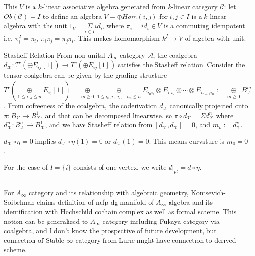 \documentclass{article}
\begin{document}
\begin{remark} [] 
This $V$ is a $k$-linear associative algebra generated from $k$-linear category $\mathcal{C}$: 
let $Ob(\mathcal{C})=I$ to define an algebra $V= \oplus Hom(i,j)$ for $i,j\in I$ is a $k$-linear algebra
with the unit $1_V = \underset{i\in I}{\Sigma} id_i$, where $\pi_i = id_i\in V$ is a commuting idempotent i.e. $\pi_i^2 = \pi_i$, 
$\pi_i \pi_j = \pi_j \pi_i$. This makes homomorphism $k^I \to V$ of algebra with unit.
\end{remark}


\begin{proposition}{Stasheff Relation}{}
From non-unital $A_\infty$ category $\mathcal{A}$, the coalgebra $d_{\mathcal{X}}: T^c (\oplus E_{ij}[1]) \to T^c (\oplus E_{ij}[1])$ 
satisfies the Stasheff relation. Consider the tensor coalgebra can be given by the grading structure
$T^c(\underset{1\leqq i,j\leqq n}{\oplus} E_{ij}[1]) = \underset{m\geqq 0}{\oplus} \underset{1\leqq i_0,i_1,i_2,\cdots i_m\leqq n}{\oplus}
E_{i_0i_1} \otimes E_{i_1i_2} \otimes \cdots \otimes E_{i_{n-1}i_n} := \underset{m\geqq 0}{\oplus} B_{\mathcal{X}}^m$.
From cofreeness of the coalgebra, the coderivation $d_{\mathcal{X}}$ canonically projected onto $\pi:B_{\mathcal{X}} \to B_{\mathcal{X}}^1$,
and that can be decomposed linearwise, so $\pi \circ d_{\mathcal{X}} = \Sigma d_{\mathcal{X}}^n$ where
$d_{\mathcal{X}}^n: B_{\mathcal{X}}^n \to B_{\mathcal{X}}^1$, and we have Stasheff relation from $[d_{\mathcal{X}}, d_{\mathcal{X}}]=0$,
and $m_n := d_{\mathcal{X}}^n$.
\end{proposition}


\begin{remark} {}{}
$d_{\mathcal{X}}\circ \eta = 0$ implies $d_{\mathcal{X}}\circ \eta (1) = 0$ or $d_{\mathcal{X}} (1) = 0$. This means curvature is $m_0=0$.
\end{remark}


\begin{remark}{}{}
For the case of $I=\{i\}$ consists of one vertex, we write $d|_{pt} = d\circ \eta$.
\end{remark}





\vspace{0.5cm}
\noindent\rule{\textwidth}{0.4pt}
\vspace{0.5cm}


For $A_\infty$ category and its relationship with algebraic geometry,
Kontsevich-Soibelman claims definition of ncfp dg-manifold of $A_\infty$ algebra and its identification with
Hochschild cochain complex as well as formal scheme.
This notion can be generalized to $A_\infty$ category including Fukaya category via coalgebra,
and I don't know the prospective of future development, but connection of Stable $\infty$-category from Lurie might have 
connection to derived scheme. \\
\end{document}
